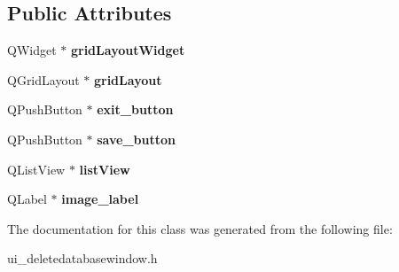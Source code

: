 \subsection*{Public Attributes}
\begin{DoxyCompactItemize}
\item 
\mbox{\label{class_ui___delete_database_window_ac2efee2937bd90f8ae73aeeb7fbfc5c7}} 
Q\+Widget $\ast$ {\bfseries grid\+Layout\+Widget}
\item 
\mbox{\label{class_ui___delete_database_window_a3ead36c1c35dc3553f892800bb5ca4bc}} 
Q\+Grid\+Layout $\ast$ {\bfseries grid\+Layout}
\item 
\mbox{\label{class_ui___delete_database_window_a684f31b53506f82ae0c1953b9016c4aa}} 
Q\+Push\+Button $\ast$ {\bfseries exit\+\_\+button}
\item 
\mbox{\label{class_ui___delete_database_window_a374b6a184ccfdc528153f49eb62d6b03}} 
Q\+Push\+Button $\ast$ {\bfseries save\+\_\+button}
\item 
\mbox{\label{class_ui___delete_database_window_abafcc266bcd9fddb53a2c34b4abb27de}} 
Q\+List\+View $\ast$ {\bfseries list\+View}
\item 
\mbox{\label{class_ui___delete_database_window_afd9a744ca7fce3b21e66ccccd41b0f01}} 
Q\+Label $\ast$ {\bfseries image\+\_\+label}
\end{DoxyCompactItemize}


The documentation for this class was generated from the following file\+:\begin{DoxyCompactItemize}
\item 
ui\+\_\+deletedatabasewindow.\+h\end{DoxyCompactItemize}
